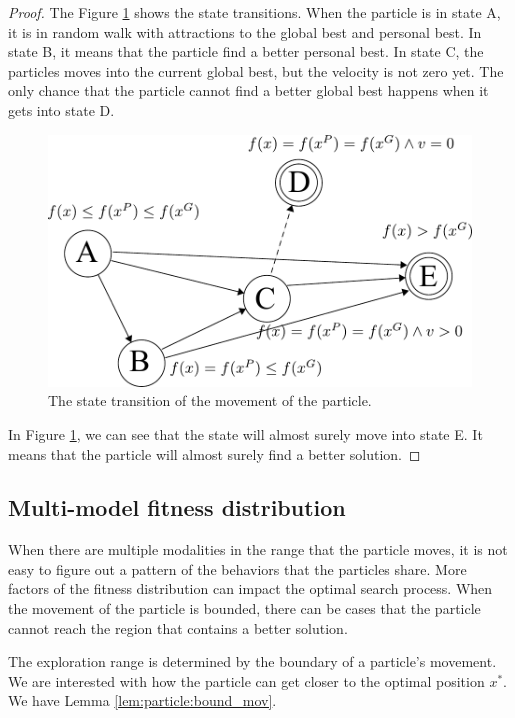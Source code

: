 \begin{mythm}
\begin{proof}
The Figure \ref{fig:fsm} shows the state transitions.
When the particle is in state A, it is in random walk with attractions to the global best and personal best.
In state B, it means that the particle find a better personal best.
In state C, the particles moves into the current global best, but the velocity is not zero yet.
The only chance that the particle cannot find a better global best happens when it gets into state D.

\begin{figure}[tbph]
\centering
\includegraphics[width=0.7\linewidth]{./fig/fsm}
\caption{The state transition of the movement of the particle.}
\label{fig:fsm}
\end{figure}

In Figure \ref{fig:fsm}, we can see that the state will almost surely move into state E.
It means that the particle will almost surely find a better solution.
\end{proof}
\end{mythm}

\subsection{Multi-model fitness distribution}

When there are multiple modalities in the range that the particle moves, it is not easy to figure out a pattern of the behaviors that the particles share.
More factors of the fitness distribution can impact the optimal search process.
When the movement of the particle is bounded, there can be cases that the particle cannot reach the region that contains a better solution.

The exploration range is determined by the boundary of a particle's movement.
We are interested with how the particle can get closer to the optimal position $ x^{*} $.
We have Lemma \ref{lem:particle:bound_mov}.

